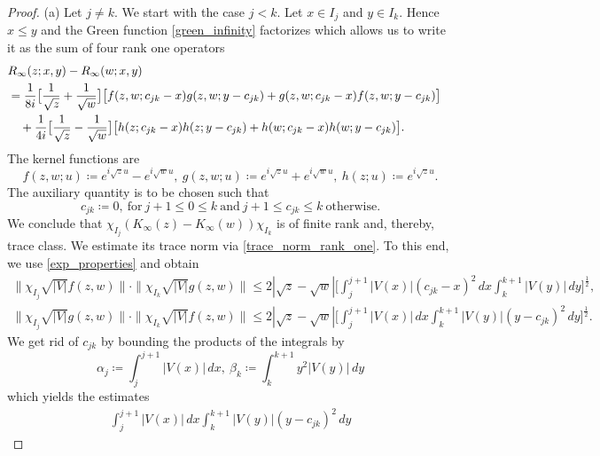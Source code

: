 \begin{proof}
(a)
Let $j\neq k$. We start with the case $j<k$.
Let $x\in I_j$ and $y\in I_k$. Hence $x\leq y$ and the Green function \eqref{green_infinity} factorizes
which allows us to write it as the sum of four rank one operators
\begin{equation*}
\begin{split}
  \lefteqn{ R_\infty(z;x,y) - R_\infty(w;x,y) }\\
     & = \frac{1}{8i} \big[\frac{1}{\sqrt{z}} + \frac{1}{\sqrt{w}}\big]
          \big[ f(z,w;c_{jk}-x)g(z,w;y-c_{jk}) + g(z,w;c_{jk}-x)f(z,w;y-c_{jk}) \big]  \\
     & \quad + \frac{1}{4i} \big[\frac{1}{\sqrt{z}}-\frac{1}{\sqrt{w}}\big] 
          \big[h(z;c_{jk}-x)h(z;y-c_{jk})+h(w;c_{jk}-x)h(w;y-c_{jk})\big] .
\end{split}
\end{equation*}
The kernel functions are
\begin{equation*}
    f(z,w;u) \coloneqq e^{i\sqrt{z}u} - e^{i\sqrt{w}u},\
    g(z,w;u) \coloneqq e^{i\sqrt{z}u} + e^{i\sqrt{w}u},\
    h(z;u) \coloneqq e^{i\sqrt{z}u} .
\end{equation*}
The auxiliary quantity is to be chosen such that
\begin{equation*}
  c_{jk} \coloneqq 0,\ \text{for}\ j+1\leq 0\leq k\ \text{and}\
     j+1 \leq c_{jk} \leq k \ \text{otherwise} .
\end{equation*}
We conclude that $\chi_{I_j}(K_\infty(z) - K_\infty(w))\chi_{I_k}$ is of finite rank and, thereby, trace class.
We estimate its trace norm via \eqref{trace_norm_rank_one}. To this end, we use \eqref{exp_properties} and obtain
\begin{gather*}
  \|\chi_{I_j}\sqrt{|V|}f(z,w)\|\cdot \|\chi_{I_k}\sqrt{|V|}g(z,w)\|
     \leq 2|\sqrt{z}-\sqrt{w}| \Big[\int_j^{j+1} |V(x)|(c_{jk}-x)^2\, dx \int_k^{k+1} |V(y)|\, dy\Big]^{\frac{1}{2}} ,\\
  \|\chi_{I_j}\sqrt{|V|}g(z,w)\|\cdot \|\chi_{I_k}\sqrt{|V|}f(z,w)\|
     \leq 2|\sqrt{z}-\sqrt{w}| \Big[\int_j^{j+1} |V(x)|\, dx \int_k^{k+1} |V(y)|(y-c_{jk})^2\, dy\Big]^{\frac{1}{2}} .
\end{gather*}
We get rid of $c_{jk}$ by bounding the products of the integrals by
\begin{equation*}
  \alpha_j \coloneqq \int_j^{j+1} |V(x)|\, dx,\ 
  \beta_k \coloneqq \int_k^{k+1}  y^2 |V(y)|\, dy
\end{equation*}
which yields the estimates
\begin{gather*}
  \int_j^{j+1}|V(x)|\, dx \int_k^{k+1} |V(y)| (y-c_{jk})^2\, dy

\end{gather*}
\end{proof}
